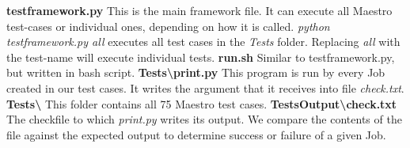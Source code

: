 \textbf{testframework.py}
\newline
\indent This is the main framework file. It can execute all Maestro test-cases or individual ones, depending on how it is called. 
\newline \textit{python testframework.py all} executes all test cases in the \textit{Tests} folder. Replacing \textit{all} with the test-name will execute individual tests. 
\newline
\newline
\textbf{run.sh}
\newline
\indent Similar to testframework.py, but written in bash script.
\newline
\newline
\textbf{Tests\textbackslash print.py}
\newline
\indent This program is run by every Job created in our test cases. It writes the argument that it receives into file \textit{check.txt}. 
\newline
\newline
\textbf{Tests\textbackslash}
\newline
\indent This folder contains all 75 Maestro test cases.
\newpage
\noindent\textbf{TestsOutput\textbackslash check.txt}
\newline
\indent The checkfile to which \textit{print.py} writes its output. We compare the contents of the file against the expected output to determine success or failure of a given Job.
\newline
\newline

